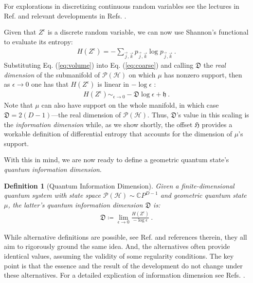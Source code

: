 \documentclass[draft,nofootinbib,pre,twocolumn,showkeys,superscriptaddress,preprintnumbers,floatfix]{revtex4-1}
\newcommand{\1}{\mathbbm{1}}
\newcommand{\PH}{\mathcal{P}(\mathcal{H})}
\newcommand{\CP}[1]{\mathbb{C}P^{#1}}
\newtheorem{Definition}{Definition}
\begin{document}
For explorations in discretizing continuous random variables see the lectures
in Ref. \cite{Graf00} and relevant developments in Refs. \cite{Brig19,Pag15}.

Given that $Z^\epsilon$ is a discrete random variable, we can now use Shannon's
functional to evaluate its entropy:
\begin{align}
H\left( Z^\epsilon \right)
  = - \sum_{\vec{j},\vec{k}} p_{\vec{j},\vec{k}} \log p_{\vec{j},\vec{k}}
  ~.
\label{eq:DiscretizedShannon}
\end{align}
Substituting Eq. (\ref{eq:volume}) into Eq. (\ref{eq:coarse}) and calling
$\mathfrak{D}$ the \emph{real dimension} of the submanifold of $\PH$ on which
$\mu$ has nonzero support, then as $\epsilon \to 0$ one has that
$H(Z^\epsilon)$ is linear in $-\log \epsilon$ \cite{Renyi59}:
\begin{align*}
H(Z^\epsilon) \sim_{\epsilon \to 0} - \mathfrak{D} \log \epsilon + \mathfrak{h}
  ~.
\end{align*}
Note that $\mu$ can also have support on the whole manifold, in which case
$\mathfrak{D} = 2(D-1)$---the real dimension of $\PH$. Thus, $\mathfrak{D}$'s
value in this scaling is the \emph{information dimension} while, as we show
shortly, the offset $\mathfrak{H}$ provides a workable definition of
differential entropy that accounts for the dimension of $\mu$'s support.

With this in mind, we are now ready to define a geometric quantum state's
\emph{quantum information dimension}.

\begin{Definition}[Quantum Information Dimension]
Given a finite-dimensional quantum system with state space $\PH \sim \CP{D-1}$ and 
geometric quantum state $\mu$, the latter's quantum information dimension $\mathfrak{D}$ is:
\begin{align}
\mathfrak{D}
  \coloneqq \lim _{\epsilon \to 0} \frac{H\left( Z^\epsilon\right)}{- \log \epsilon}\label{eq:D}
  ~.
\end{align}
\end{Definition}

While alternative definitions are possible, see Ref. \cite{Wu10} and references
therein, they all aim to rigorously ground the same idea. And, the
alternatives often provide identical values, assuming the validity of some
regularity conditions. The key point is that the essence and the result of the
development do not change under these alternatives. For a detailed explication
of information dimension see Refs. \cite{Renyi59,Wu10,Farm83}.
\end{document}
